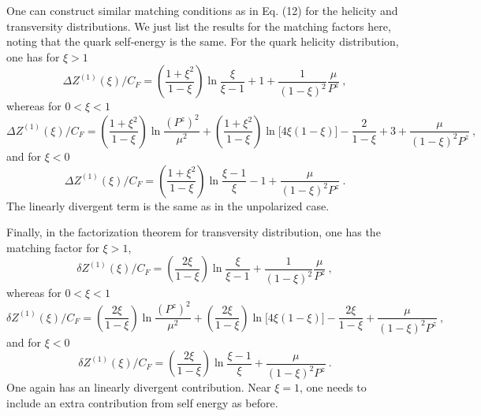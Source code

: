 One can construct similar matching conditions as in Eq. (12) for the helicity and transversity distributions.
We just list the results for the matching factors here, noting that the quark self-energy is the same.
For the quark helicity distribution, one has for $\xi>1$
\begin{equation}
   \Delta Z^{(1)}(\xi)/C_F = \left(\frac{1+\xi^2}{1-\xi}\right)\ln \frac{\xi}{\xi-1} + 1 + \frac{1}{(1-\xi)^2}\frac{\mu}{P^z} \ ,
\end{equation}
whereas for $0<\xi<1$
\begin{equation}
   \Delta Z^{(1)}(\xi)/C_F = \left(\frac{1+\xi^2}{1-\xi}\right)\ln \frac{(P^z)^2}{\mu^2}+\left(\frac{1+\xi^2}{1-\xi}\right)\ln\big[{4\xi(1-\xi)}\big]-\frac{2}{1-\xi}+3 +\frac{\mu}{(1-\xi)^2P^z} \ ,
\end{equation}
and for $\xi<0$
\begin{equation}
   \Delta Z^{(1)}(\xi)/C_F = \left(\frac{1+\xi^2}{1-\xi}\right)\ln \frac{\xi-1}{\xi}-1 +\frac{\mu}{(1-\xi)^2P^z} \ .
\end{equation}
The linearly divergent term is the same as in the unpolarized case.

Finally, in the factorization theorem for transversity distribution, one has the matching factor for $\xi>1$,
\begin{equation}
   \delta Z^{(1)}(\xi)/C_F = \left(\frac{2\xi}{1-\xi}\right)\ln \frac{\xi}{\xi-1} + \frac{1}{(1-\xi)^2}\frac{\mu}{P^z} \ ,
\end{equation}
whereas for $0<\xi<1$
\begin{equation}
   \delta Z^{(1)}(\xi)/C_F = \left(\frac{2\xi}{1-\xi}\right)\ln \frac{(P^z)^2}{\mu^2}+\left(\frac{2\xi}{1-\xi}\right)\ln\big[{4\xi(1-\xi)}\big]-\frac{2\xi}{1-\xi} +\frac{\mu}{(1-\xi)^2P^z} \ ,
\end{equation}
and for $\xi<0$
\begin{equation}
   \delta Z^{(1)}(\xi)/C_F = \left(\frac{2\xi}{1-\xi}\right)\ln \frac{\xi-1}{\xi}+\frac{\mu}{(1-\xi)^2P^z} \ .
\end{equation}
One again has an linearly divergent contribution. Near $\xi=1$, one needs to include an extra contribution from self energy as before.
